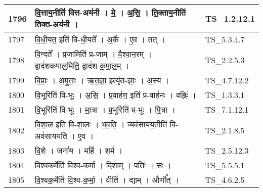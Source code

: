 \documentclass[17pt]{extarticle}
\begin{document}
\begin{longtable}{||p{0.4in}||p{4.9in}||p{0.9in}||}
    \hline
        
    1796 & वि॒त्ताय॒नीति॑ वित्त{-}अय॑नी   ।   मे॒   ।   अ॒सि॒   ।   ति॒क्ताय॒नीति॑ तिक्त{-}अय॑नी   ।    & TS\_1.2.12.1       \\
    
    \hline
        
    1797 & वि॒धी॒यत॒ इति॑ वि{-}धी॒यते᳚   ।   अ॒र्के   ।   ए॒व   ।   तत्   ।    & TS\_5.3.4.7       \\
    
    \hline
        
    1798 & वि॒न्दते᳚   ।   प्र॒जामिति॑ प्र{-}जाम्   ।   वै॒श्वा॒न॒रम्   ।   द्वाद॑शकपाल॒मिति॒ द्वाद॑श{-}क॒पा॒ल॒म्   ।    & TS\_2.2.5.3       \\
    
    \hline
        
    1799 & वि॒प्राः॒   ।   अ॒मृ॒ताः॒   ।   ऋ॒त॒ज्ञा॒ इत्यृ॑त{-}ज्ञाः॒   ।   अ॒स्य   ।    & TS\_4.7.12.2       \\
    
    \hline
        
    1800 & वि॒भूरिति॑ वि{-}भूः   ।   अ॒सि॒   ।   प्र॒वाह॑ण॒ इति॑ प्र{-}वाह॑नः   ।   वह्निः॑   ।    & TS\_1.3.3.1       \\
    
    \hline
        
    1801 & वि॒भूरिति॑ वि{-}भूः   ।   मा॒त्रा   ।   प्र॒भूरिति॑ प्र{-}भूः   ।   पि॒त्रा   ।    & TS\_7.1.12.1       \\
    
    \hline
        
    1802 & वि॒शा॒ल इति॑ वि{-}शा॒लः   ।   भ॒व॒ति॒   ।   व्यव॑सायय॒तीति॑ वि{-}अव॑साययति   ।   ए॒व   ।    & TS\_2.1.8.5       \\
    
    \hline
        
    1803 & वि॒शे   ।   जना॑य   ।   महि॑   ।   शर्म॑   ।    & TS\_2.5.12.3       \\
    
    \hline
        
    1804 & वि॒श्वक॒र्मेति॑ वि॒श्व{-}क॒र्मा॒   ।   दि॒शाम्   ।   पतिः॑   ।   सः   ।    & TS\_5.5.5.1       \\
    
    \hline
        
    1805 & वि॒श्वक॒र्मेति॑ वि॒श्व{-}क॒र्मा॒   ।   वीति॑   ।   द्याम्   ।   और्णो᳚त्   ।    & TS\_4.6.2.5       \\
    

\end{longtable}
\end{document}
